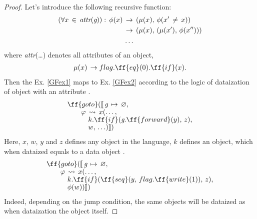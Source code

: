 \documentclass[sigplan,review,11pt,nonacm,natbib=false]{acmart}
\theoremstyle{theorems}
\newcommand\br{\\[-4pt]}
\begin{document}
    \begin{proof}
        Let's introduce the following recursive function:
        \begin{equation}
            \begin{split}
            (\forall x\,\in\,\emph{attr}(\emph{g})):\,\phi(x)\,&\rightarrow\,(\mu(x),\,\phi(x'\,\neq\,x)) \\
            &\rightarrow\,(\mu(x),\,(\mu(x'),\,\phi(x''))) \\
            &\ldots
            \end{split}
        \end{equation}
        where \emph{attr}(\ldots) denotes all attributes of an object,
        \begin{equation}
            \begin{split}
                & \mu(x)\,\rightarrow flag.\ff{eq}(0).\ff{if}(x) .\\
            \end{split}
        \end{equation}
        Then the Ex. \ref{GFex1} maps to Ex. \ref{GFex2} according to the logic of dataization of  object with an attribute .
        \begin{equation}\label{GFex1}
        \begin{split}
            & \ff{goto}(\llbracket\,\emph{g}\,\mapsto\,\varnothing,\br
            & \quad \quad \varphi\,\leadsto\,x(\ldots,\br
            & \quad \quad \quad k.\ff{if}(\emph{g}.\ff{forward}(y),\,z),\br
            & \quad \quad \quad w,\,\ldots)\rrbracket) \\
        \end{split}
        \end{equation}
        Here, $x$, $w$, $y$ and $z$ defines any object in the language, $k$ defines an object, which when dataized equals to a data object .
        \begin{equation}\label{GFex2}
        \begin{split}
            & \ff{goto}(\llbracket\,\emph{g}\,\mapsto\,\varnothing,\br
            & \quad \quad \varphi\,\leadsto\,x(\ldots,\br
            & \quad \quad \quad k.\ff{if}(\ff{seq}(y,\,flag.\ff{write}(1)),\,z),\br
            & \quad \quad \quad \phi(w))\rrbracket) \\
        \end{split}
        \end{equation}
        Indeed, depending on the jump condition, the same objects will be dataized as when dataization the  object itself.
    \end{proof}
\end{document}
